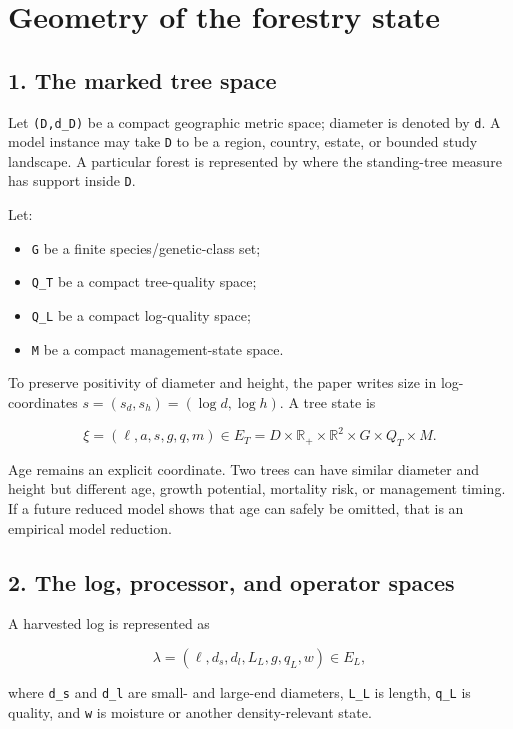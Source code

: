 \section{Geometry of the forestry state}\label{geometry-of-the-forestry-state}

\subsection{1. The marked tree space}\label{the-marked-tree-space}

Let \texttt{(D,d\_D)} be a compact geographic metric space; diameter is denoted by \texttt{d}.
A model instance may take \texttt{D} to be a region,
country, estate, or bounded study landscape. A particular forest is represented
by where the standing-tree measure has support inside \texttt{D}.

Let:

\begin{itemize}
\tightlist
\item
  \texttt{G} be a finite species/genetic-class set;
\item
  \texttt{Q\_T} be a compact tree-quality space;
\item
  \texttt{Q\_L} be a compact log-quality space;
\item
  \texttt{M} be a compact management-state space.
\end{itemize}

To preserve positivity of diameter and height, the paper writes size in
log-coordinates $s=(s_d,s_h)=(\log d,\log h)$. A tree state is

\[
\xi=(\ell,a,s,g,q,m)\in
E_T=D\times\mathbb R_+\times\mathbb R^2\times G\times Q_T\times M.
\]

Age remains an explicit coordinate. Two trees can have similar diameter and height but different age, growth
potential, mortality risk, or management timing. If a future reduced model
shows that age can safely be omitted, that is an empirical model reduction.

\subsection{2. The log, processor, and operator spaces}\label{the-log-processor-and-operator-spaces}

A harvested log is represented as

\[
\lambda=(\ell,d_s,d_l,L_L,g,q_L,w)\in E_L,
\]

where \texttt{d\_s} and \texttt{d\_l} are small- and large-end diameters, \texttt{L\_L} is length, \texttt{q\_L}
is quality, and \texttt{w} is moisture or another density-relevant state.

